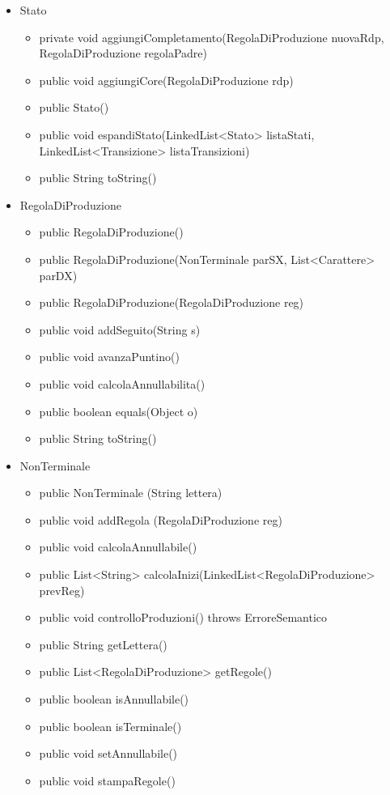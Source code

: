 \documentclass[12pt]{article}
\begin{document}
\begin{itemize}
\item Stato
\begin{itemize}
\item private void aggiungiCompletamento(RegolaDiProduzione nuovaRdp, RegolaDiProduzione regolaPadre)
\item public void aggiungiCore(RegolaDiProduzione rdp)
\item public Stato()
\item public void espandiStato(LinkedList<Stato> listaStati, LinkedList<Transizione> listaTransizioni)
\item public String toString()
\end{itemize}
\item RegolaDiProduzione
\begin{itemize}
\item public RegolaDiProduzione()
\item public RegolaDiProduzione(NonTerminale parSX, List<Carattere> parDX)
\item public RegolaDiProduzione(RegolaDiProduzione reg)
\item public void addSeguito(String s)
\item public void avanzaPuntino()
\item public void calcolaAnnullabilita()
\item public boolean equals(Object o)
\item public String toString()
\end{itemize}
\item NonTerminale
\begin{itemize}
\item public NonTerminale (String lettera)
\item public void addRegola (RegolaDiProduzione reg)
\item public void calcolaAnnullabile()
\item public List<String> calcolaInizi(LinkedList<RegolaDiProduzione> prevReg)
\item public void controlloProduzioni() throws ErroreSemantico
\item public String getLettera()
\item public List<RegolaDiProduzione> getRegole()
\item public boolean isAnnullabile()
\item public boolean isTerminale()
\item public void setAnnullabile()
\item public void stampaRegole()

\end{itemize}
\end{itemize}
\end{document}

